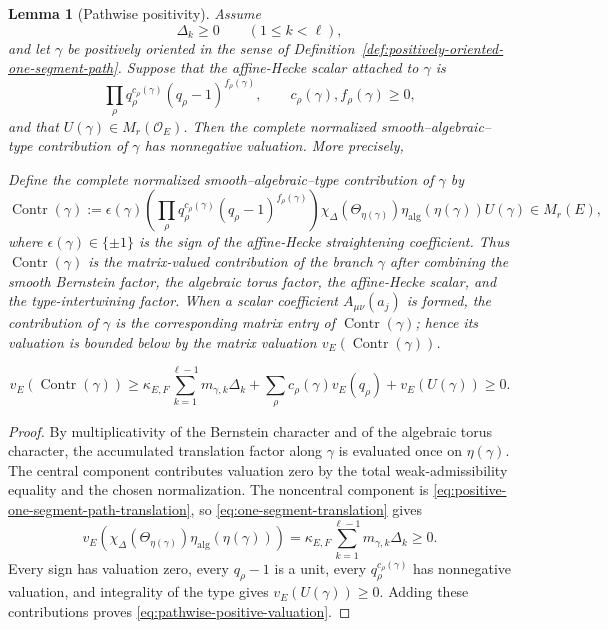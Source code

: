 \documentclass[12pt]{article}
\newtheorem{lemma}[theorem]{Lemma}
\theoremstyle{definition}
\theoremstyle{remark}
\newcommand{\Ocoeff}{\mathcal O_E}
\begin{document}
\begin{lemma}[Pathwise positivity]
\label{lem:pathwise-positivity-one-segment}
Assume
\[
 \Delta_k\geq0
 \qquad(1\leq k<\ell),
\]
and let \(\gamma\) be positively oriented in the sense of
Definition~\ref{def:positively-oriented-one-segment-path}.  Suppose that the
affine-Hecke scalar attached to \(\gamma\) is
\[
 \prod_\rho q_\rho^{c_\rho(\gamma)}
 (q_\rho-1)^{f_\rho(\gamma)},
 \qquad
 c_\rho(\gamma),f_\rho(\gamma)\geq0,
\]
and that \(U(\gamma)\in M_r(\Ocoeff)\).  Then the complete normalized
smooth--algebraic--type contribution of \(\gamma\) has nonnegative
valuation.  More precisely,

Define the \emph{complete normalized smooth--algebraic--type
contribution} of \(\gamma\) by
\begin{equation}\label{eq:one-segment-path-contribution-definition}
 \operatorname{Contr}(\gamma)
 :=
 \epsilon(\gamma)
 \left(
 \prod_\rho
 q_\rho^{c_\rho(\gamma)}
 (q_\rho-1)^{f_\rho(\gamma)}
 \right)
 \chi_\Delta\!\left(\Theta_{\eta(\gamma)}\right)
 \eta_{\mathrm{alg}}\!\left(\eta(\gamma)\right)
 U(\gamma)
 \in M_r(E),
\end{equation}
where \(\epsilon(\gamma)\in\{\pm1\}\) is the sign of the affine-Hecke
straightening coefficient.  Thus \(\operatorname{Contr}(\gamma)\) is the
matrix-valued contribution of the branch \(\gamma\) after combining the
smooth Bernstein factor, the algebraic torus factor, the affine-Hecke scalar,
and the type-intertwining factor.  When a scalar coefficient
\(A_{\mu\nu}(a_j)\) is formed, the contribution of \(\gamma\) is the
corresponding matrix entry of \(\operatorname{Contr}(\gamma)\); hence its
valuation is bounded below by the matrix valuation
\(v_E(\operatorname{Contr}(\gamma))\).

\begin{equation}\label{eq:pathwise-positive-valuation}
 v_E(\operatorname{Contr}(\gamma))
 \geq
 \kappa_{E,F}
 \sum_{k=1}^{\ell-1}
 m_{\gamma,k}\Delta_k
 +
 \sum_\rho c_\rho(\gamma)v_E(q_\rho)
 +
 v_E(U(\gamma))
 \geq0.
\end{equation}
\end{lemma}

\begin{proof}
By multiplicativity of the Bernstein character and of the algebraic torus
character, the accumulated translation factor along \(\gamma\) is evaluated
once on \(\eta(\gamma)\).  The central component contributes valuation zero
by the total weak-admissibility equality and the chosen normalization.  The
noncentral component is
\eqref{eq:positive-one-segment-path-translation}, so
\eqref{eq:one-segment-translation} gives
\[
 v_E\!\left(
 \chi_\Delta(\Theta_{\eta(\gamma)})
 \eta_{\mathrm{alg}}(\eta(\gamma))
 \right)
 =
 \kappa_{E,F}
 \sum_{k=1}^{\ell-1}
 m_{\gamma,k}\Delta_k
 \geq0.
\]
Every sign has valuation zero, every \(q_\rho-1\) is a unit, every
\(q_\rho^{c_\rho(\gamma)}\) has nonnegative valuation, and integrality of the
type gives \(v_E(U(\gamma))\geq0\).  Adding these contributions proves
\eqref{eq:pathwise-positive-valuation}.
\end{proof}
\end{document}

